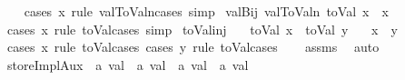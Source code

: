 \begin{isabellebody}
%
\isadelimproof
\ \ %
\endisadelimproof
%
\isatagproof
{}\isamarkupfalse%
\ {\isacharparenleft}{\kern0pt}cases\ x\ rule{\isacharcolon}{\kern0pt}\ val{}ToValn{\isachardot}{\kern0pt}cases{\isacharsemicolon}{\kern0pt}\ simp{\isacharparenright}{\kern0pt}%
\endisatagproof
{\isafoldproof}%
%
\isadelimproof
\isanewline
%
\endisadelimproof
\isanewline
{}\isamarkupfalse%
\ valBij{}{\isacharcolon}{\kern0pt}\ {\isachardoublequoteopen}val{}ToValn\ {\isacharparenleft}{\kern0pt}toVal{}{}{}{}\ x{\isacharparenright}{\kern0pt}\ {\isacharequal}{\kern0pt}\ x{\isachardoublequoteclose}\isanewline
%
\isadelimproof
\ \ %
\endisadelimproof
%
\isatagproof
{}\isamarkupfalse%
\ {\isacharparenleft}{\kern0pt}cases\ x\ rule{\isacharcolon}{\kern0pt}\ toVal{}{}{}{}{\isachardot}{\kern0pt}cases{\isacharsemicolon}{\kern0pt}\ simp{\isacharparenright}{\kern0pt}%
\endisatagproof
{\isafoldproof}%
%
\isadelimproof
\isanewline
%
\endisadelimproof
\isanewline
{}\isamarkupfalse%
\ toVal{}{}{}{}{\isacharunderscore}{\kern0pt}inj{\isacharcolon}{\kern0pt}\isanewline
\ \ \ {\isachardoublequoteopen}toVal{}{}{}{}\ x\ {\isacharequal}{\kern0pt}\ toVal{}{}{}{}\ y{\isachardoublequoteclose}\isanewline
\ \ \ {\isachardoublequoteopen}x\ {\isacharequal}{\kern0pt}\ y{\isachardoublequoteclose}\isanewline
%
\isadelimproof
\ \ %
\endisadelimproof
%
\isatagproof
{}\isamarkupfalse%
\ {\isacharparenleft}{\kern0pt}cases\ x\ rule{\isacharcolon}{\kern0pt}\ toVal{}{}{}{}{\isachardot}{\kern0pt}cases{\isacharsemicolon}{\kern0pt}\ cases\ y\ rule{\isacharcolon}{\kern0pt}\ toVal{}{}{}{}{\isachardot}{\kern0pt}cases{\isacharparenright}{\kern0pt}\isanewline
\ \ \isamarkupfalse%
\ assms\ \isamarkupfalse%
\ auto%
\endisatagproof
{\isafoldproof}%
%
\isadelimproof
%
\endisadelimproof
%
\isadelimdocument
%
\endisadelimdocument
%
\isatagdocument
%
\isamarkuptrue%
%
\endisatagdocument
{\isafolddocument}%
%
\isadelimdocument
%
\endisadelimdocument
{}\isamarkupfalse%
\ storeImplAux\ {\isacharcolon}{\kern0pt}{\isacharcolon}{\kern0pt}\ {\isachardoublequoteopen}{\isacharprime}{\kern0pt}a\ val{}{}{}{}\ {\isasymRightarrow}\ {\isacharprime}{\kern0pt}a\ val{}{}{}{}\ {\isasymRightarrow}\ {\isacharprime}{\kern0pt}a\ val{}{}{}{}\ {\isasymRightarrow}\ {\isacharprime}{\kern0pt}a\ val{}{}{}{}{\isachardoublequoteclose}\ \isanewline

\end{isabellebody}
